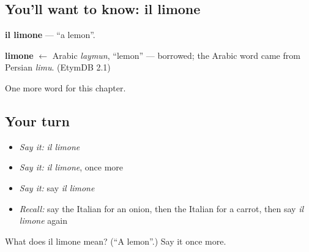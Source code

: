 \subsection*{You'll want to know: il limone}
\textbf{il limone} — \textquotedblleft{}a lemon\textquotedblright{}.

\begin{cousinweb}
\textbf{limone} $\leftarrow$ Arabic \emph{laymun}, \textquotedblleft{}lemon\textquotedblright{} — borrowed; the Arabic word came from Persian \emph{limu}. (EtymDB 2.1)
\end{cousinweb}

\begin{grammarlens}[title={What you've built}]
One more word for this chapter.
\end{grammarlens}

\subsection*{Your turn}
\begin{itemize}
\raggedright
  \item \emph{Say it:} \emph{il limone}
  \item \emph{Say it:} \emph{il limone}, once more
  \item \emph{Say it:} say \emph{il limone}
  \item \emph{Recall:} say the Italian for an onion, then the Italian for a carrot, then say \emph{il limone} again
\end{itemize}

\begin{tcolorbox}[breakable,colback=teal!4,colframe=teal!35!black,title={Before you move on}]
What does il limone mean? (\textquotedblleft{}A lemon\textquotedblright{}.) Say it once more.
\end{tcolorbox}
